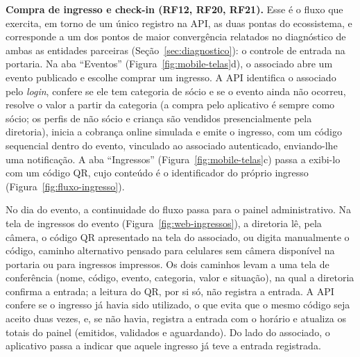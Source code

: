 \documentclass[12pt,a4paper]{article}
\begin{document}
\textbf{Compra de ingresso e check-in (RF12, RF20, RF21).} Esse é o fluxo que exercita, em torno de um
único registro na API, as duas pontas do ecossistema, e corresponde a um dos pontos de maior
convergência relatados no diagnóstico de ambas as entidades parceiras
(Seção~\ref{sec:diagnostico}): o controle de entrada na portaria. Na aba ``Eventos''
(Figura~\ref{fig:mobile-telas}d), o associado abre um evento publicado e escolhe comprar um ingresso.
A API identifica o associado pelo \textit{login}, confere se ele tem categoria de sócio e se o evento ainda
não ocorreu, resolve o valor a partir da categoria (a compra pelo aplicativo é sempre como sócio; os
perfis de não sócio e criança são vendidos presencialmente pela diretoria), inicia a cobrança online
simulada e emite o ingresso, com um código sequencial dentro do evento, vinculado ao associado
autenticado, enviando-lhe uma notificação. A aba ``Ingressos'' (Figura~\ref{fig:mobile-telas}c) passa
a exibi-lo com um código QR, cujo conteúdo é o identificador do próprio ingresso
(Figura~\ref{fig:fluxo-ingresso}).

No dia do evento, a continuidade do fluxo passa para o painel administrativo. Na tela de ingressos do
evento (Figura~\ref{fig:web-ingressos}), a diretoria lê, pela câmera, o código QR apresentado na tela
do associado, ou digita manualmente o código, caminho alternativo pensado para celulares sem câmera
disponível na portaria ou para ingressos impressos. Os dois caminhos levam a uma tela de conferência
(nome, código, evento, categoria, valor e situação), na qual a diretoria confirma a entrada; a leitura
do QR, por si só, não registra a entrada. A API confere se o ingresso já havia sido utilizado, o que
evita que o mesmo código seja aceito duas vezes, e, se não havia, registra a entrada com o horário e
atualiza os totais do painel (emitidos, validados e aguardando). Do lado do associado, o aplicativo
passa a indicar que aquele ingresso já teve a entrada registrada.
\end{document}
